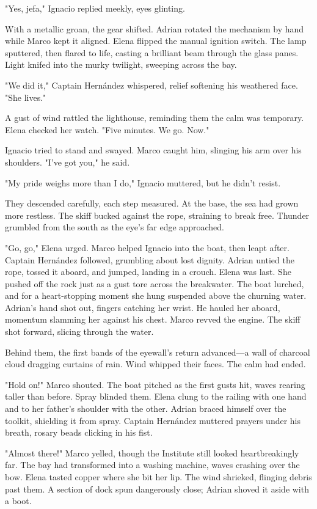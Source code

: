 "Yes, jefa," Ignacio replied meekly, eyes glinting.

With a metallic groan, the gear shifted. Adrian rotated the mechanism by hand while Marco kept it aligned. Elena flipped the manual ignition switch. The lamp sputtered, then flared to life, casting a brilliant beam through the glass panes. Light knifed into the murky twilight, sweeping across the bay.

"We did it," Captain Hernández whispered, relief softening his weathered face. "She lives."

A gust of wind rattled the lighthouse, reminding them the calm was temporary. Elena checked her watch. "Five minutes. We go. Now."

Ignacio tried to stand and swayed. Marco caught him, slinging his arm over his shoulders. "I've got you," he said.

"My pride weighs more than I do," Ignacio muttered, but he didn't resist.

They descended carefully, each step measured. At the base, the sea had grown more restless. The skiff bucked against the rope, straining to break free. Thunder grumbled from the south as the eye's far edge approached.

"Go, go," Elena urged. Marco helped Ignacio into the boat, then leapt after. Captain Hernández followed, grumbling about lost dignity. Adrian untied the rope, tossed it aboard, and jumped, landing in a crouch. Elena was last. She pushed off the rock just as a gust tore across the breakwater. The boat lurched, and for a heart-stopping moment she hung suspended above the churning water. Adrian's hand shot out, fingers catching her wrist. He hauled her aboard, momentum slamming her against his chest. Marco revved the engine. The skiff shot forward, slicing through the water.

Behind them, the first bands of the eyewall's return advanced—a wall of charcoal cloud dragging curtains of rain. Wind whipped their faces. The calm had ended.

"Hold on!" Marco shouted. The boat pitched as the first gusts hit, waves rearing taller than before. Spray blinded them. Elena clung to the railing with one hand and to her father's shoulder with the other. Adrian braced himself over the toolkit, shielding it from spray. Captain Hernández muttered prayers under his breath, rosary beads clicking in his fist.

"Almost there!" Marco yelled, though the Institute still looked heartbreakingly far. The bay had transformed into a washing machine, waves crashing over the bow. Elena tasted copper where she bit her lip. The wind shrieked, flinging debris past them. A section of dock spun dangerously close; Adrian shoved it aside with a boot.

